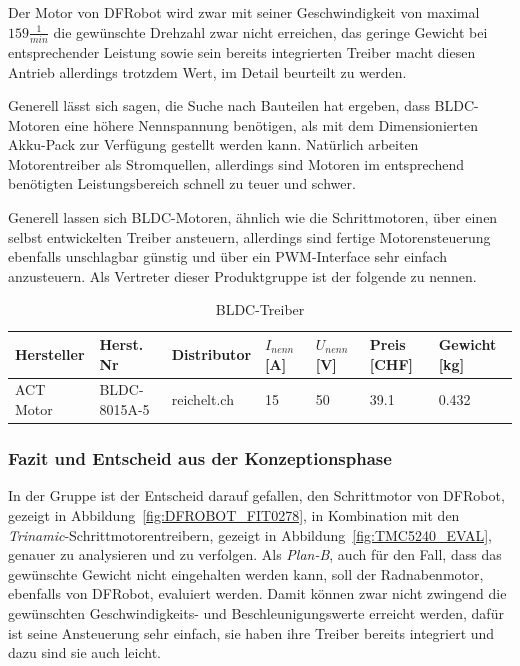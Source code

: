 \documentclass[main.tex]{subfiles} %
\begin{document}
Der Motor von DFRobot wird zwar mit seiner Geschwindigkeit von maximal $159
    \frac{1}{min}$ die gewünschte Drehzahl zwar nicht erreichen, das geringe
Gewicht bei entsprechender Leistung sowie sein bereits integrierten Treiber
macht diesen Antrieb allerdings trotzdem Wert, im Detail beurteilt zu werden.

Generell lässt sich sagen, die Suche nach Bauteilen hat ergeben, dass
BLDC-Motoren eine höhere Nennspannung benötigen, als mit dem Dimensionierten
Akku-Pack zur Verfügung gestellt werden kann. Natürlich arbeiten Motorentreiber
als Stromquellen, allerdings sind Motoren im entsprechend benötigten
Leistungsbereich schnell zu teuer und schwer.

Generell lassen sich BLDC-Motoren, ähnlich wie die Schrittmotoren, über einen
selbst entwickelten Treiber ansteuern, allerdings sind fertige Motorensteuerung
ebenfalls unschlagbar günstig und über ein PWM-Interface sehr einfach
anzusteuern. Als Vertreter dieser Produktgruppe ist der folgende zu nennen.

\begin{table}[h]
    \centering
    \begin{tabular}{|p{2cm}|p{3cm}|p{2cm}|p{1cm}|p{1cm}|p{1cm}|p{1.5cm}|}
        \hline
        Hersteller & Herst. Nr    & Distributor & $I_{nenn} $ [A] & $U_{nenn}$ [V] & Preis [CHF] & Gewicht [kg] \\ \hline
        ACT Motor  & BLDC-8015A-5 & reichelt.ch & 15              & 50             & 39.1        & 0.432        \\ \hline
    \end{tabular}
    \caption{BLDC-Treiber}
\end{table}

\subsubsection*{Fazit und Entscheid aus der Konzeptionsphase}  %

In der Gruppe ist der Entscheid darauf gefallen, den Schrittmotor von DFRobot,
gezeigt in Abbildung~\ref{fig:DFROBOT_FIT0278}, in Kombination mit den
\textit{Trinamic}-Schrittmotorentreibern, gezeigt in
Abbildung~\ref{fig:TMC5240_EVAL}, genauer zu analysieren und zu verfolgen. Als
\textit{Plan-B}, auch für den Fall, dass das gewünschte Gewicht nicht
eingehalten werden kann, soll der Radnabenmotor, ebenfalls von DFRobot,
evaluiert werden. Damit können zwar nicht zwingend die gewünschten
Geschwindigkeits- und Beschleunigungswerte erreicht werden, dafür ist seine
Ansteuerung sehr einfach, sie haben ihre Treiber bereits integriert und dazu
sind sie auch leicht.
\end{document}
